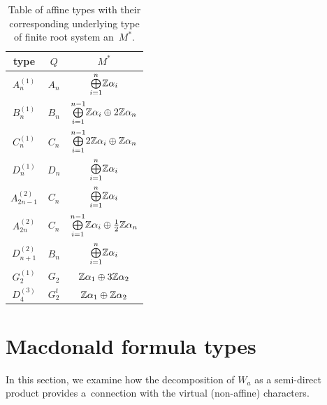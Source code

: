 \documentclass[pdftex]{sigma}
\numberwithin{equation}{section}
\begin{document}
\begin{table}[th]\centering\renewcommand{\arraystretch}{1.32}
\caption{Table of affine types with their corresponding underlying type of finite root system an~$M^{\ast}$.}\label{table2}
\begin{tabular}{|c|c|c|}
\hline
type & $Q$ & $M^{\ast }$ \\ \hline
$A_{n}^{(1)}$ & $A_{n}$ & ${\textstyle\bigoplus\limits_{i=1}^{n}}\mathbb{%
	Z\alpha }_{i}$ \\ \hline
$B_{n}^{(1)}$ & $B_{n}$ & ${\textstyle\bigoplus\limits_{i=1}^{n-1}}\mathbb{%
	Z\alpha }_{i}\oplus 2\mathbb{Z}\alpha _{n}$ \\ \hline
$C_{n}^{(1)}$ & $C_{n}$ & ${\textstyle\bigoplus\limits_{i=1}^{n-1}}2\mathbb{%
	Z\alpha }_{i}\oplus \mathbb{Z}\alpha _{n}$ \\ \hline
$D_{n}^{(1)}$ & $D_{n}$ & ${\textstyle\bigoplus\limits_{i=1}^{n}}\mathbb{%
	Z\alpha }_{i}$ \\ \hline
$A_{2n-1}^{(2)}$ & $C_{n}$ & ${\textstyle\bigoplus\limits_{i=1}^{n}}\mathbb{%
	Z\alpha }_{i}$ \\ \hline
$A_{2n}^{(2)}$ & $C_{n}$ & ${\textstyle\bigoplus\limits_{i=1}^{n-1}}\mathbb{%
	Z\alpha }_{i}\oplus \frac{1}{2}\mathbb{Z}\alpha _{n}$ \\ \hline
$D_{n+1}^{(2)}$ & $B_{n}$ & ${\textstyle\bigoplus\limits_{i=1}^{n}}\mathbb{%
	Z\alpha }_{i}$ \\ \hline
$G_{2}^{(1)}$ & $G_{2}$ & ${\textstyle}\mathbb{Z\alpha }_{1}\oplus 3\mathbb{%
	Z\alpha }_{2}$ \\ \hline
$D_{4}^{(3)}$ & $G_{2}^{t}$ & ${\textstyle}\mathbb{Z\alpha }_{1}\oplus
\mathbb{Z\alpha }_{2}$ \\ \hline
\end{tabular}
\end{table}

\section{Macdonald formula types}\label{sec:3}

In this section, we examine how the decomposition of $W_a$ as a semi-direct product provides a~connection with the virtual (non-affine) characters.
\end{document}
